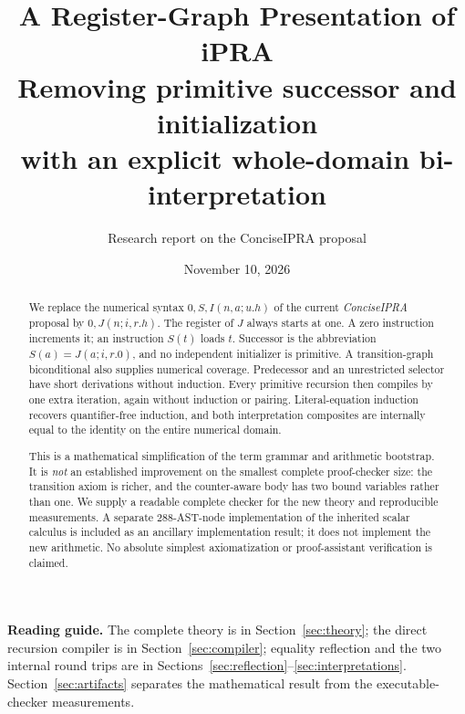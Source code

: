 \documentclass[11pt,letterpaper]{article}
\title{\color{ink}\bfseries A Register-Graph Presentation of iPRA\\[8pt]
\large Removing primitive successor and initialization\\with an explicit whole-domain bi-interpretation}
\author{Research report on the ConciseIPRA proposal}
\date{November 10, 2026}
\theoremstyle{definition}\newtheorem{definition}[theorem]{Definition}
\theoremstyle{remark}\newtheorem{remark}[theorem]{Remark}
\begin{document}
\maketitle
\begin{abstract}
We replace the numerical syntax $0,S,I(n,a;u.h)$ of the current
\emph{ConciseIPRA} proposal by $0,J(n;i,r.h)$. The register of $J$ always
starts at one. A zero instruction increments it; an instruction $S(t)$
loads $t$. Successor is the abbreviation $S(a)=J(a;i,r.0)$, and no
independent initializer is primitive. A transition-graph biconditional
also supplies numerical coverage. Predecessor and an unrestricted
selector have short derivations without induction. Every primitive
recursion then compiles by one extra iteration, again without induction
or pairing. Literal-equation induction recovers quantifier-free
induction, and both interpretation composites are internally equal to
the identity on the entire numerical domain.

This is a mathematical simplification of the term grammar and arithmetic
bootstrap. It is \emph{not} an established improvement on the smallest
complete proof-checker size: the transition axiom is richer, and the
counter-aware body has two bound variables rather than one. We supply a
readable complete checker for the new theory and reproducible measurements.
A separate 288-AST-node implementation of the inherited scalar calculus
is included as an ancillary implementation result; it does not implement
the new arithmetic. No absolute simplest axiomatization or
proof-assistant verification is claimed.
\end{abstract}
\begin{center}
\end{center}
\medskip
\noindent\textbf{Reading guide.} The complete theory is in
Section~\ref{sec:theory}; the direct recursion compiler is in
Section~\ref{sec:compiler}; equality reflection and the two internal
round trips are in Sections~\ref{sec:reflection}--\ref{sec:interpretations}.
Section~\ref{sec:artifacts} separates the mathematical result from
the executable-checker measurements.
\newpage
\end{document}
